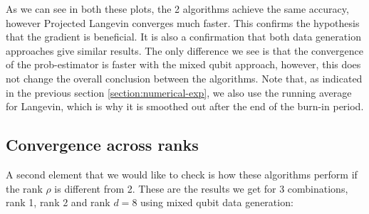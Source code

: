 \documentclass[12pt]{memoir}
\begin{document}
As we can see in both these plots, the 2 algorithms achieve the same accuracy, however Projected Langevin converges much faster. This confirms the hypothesis that the gradient is beneficial. It is also a confirmation that both data generation approaches give similar results. The only difference we see is that the convergence of the prob-estimator is faster with the mixed qubit approach, however, this does not change the overall conclusion between the algorithms. Note that, as indicated in the previous section \ref{section:numerical-exp}, we also use the running average for Langevin, which is why it is smoothed out after the end of the burn-in period.

\subsection*{Convergence across ranks}
A second element that we would like to check is how these algorithms perform if the rank $\rho$ is different from 2. These are the results we get for 3 combinations, rank 1, rank 2 and rank $d=8$ using mixed qubit data generation:
\end{document}
